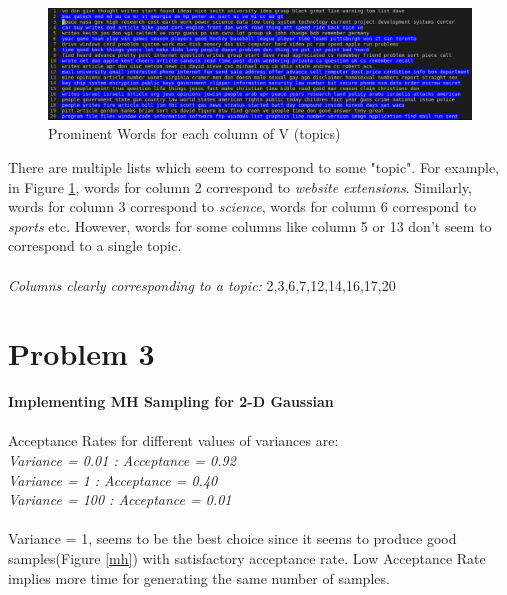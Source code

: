 \documentclass{article}
\begin{document}
\begin{figure}[h!]
\begin{center}
\includegraphics[scale=0.45]{topics.png}
\caption{Prominent Words for each column of V (topics)}
\label{topics}
\end{center}
\end{figure}

There are multiple lists which seem to correspond to some "topic". For example, in Figure \ref{topics}, words for column 2 correspond to \emph{website extensions}. Similarly, words for column 3 correspond to \emph{science}, words for column 6 correspond to \emph{sports} etc. However, words for some columns like column 5 or 13 don't seem to correspond to a single topic. \\ \\
\emph{Columns clearly corresponding to a topic: } 2,3,6,7,12,14,16,17,20

\section*{Problem 3}
\textbf{Implementing MH Sampling for 2-D Gaussian} \\ \\
Acceptance Rates for different values of variances are: \\
\emph{Variance = 0.01 : Acceptance = 0.92} \\
\emph{Variance = 1 : Acceptance = 0.40}\\
\emph{Variance = 100 : Acceptance = 0.01} \\ \\
Variance = 1, seems to be the best choice since it seems to produce good samples(Figure \ref{mh}) with satisfactory acceptance rate. Low Acceptance Rate implies more time for generating the same number of samples.
\end{document}
